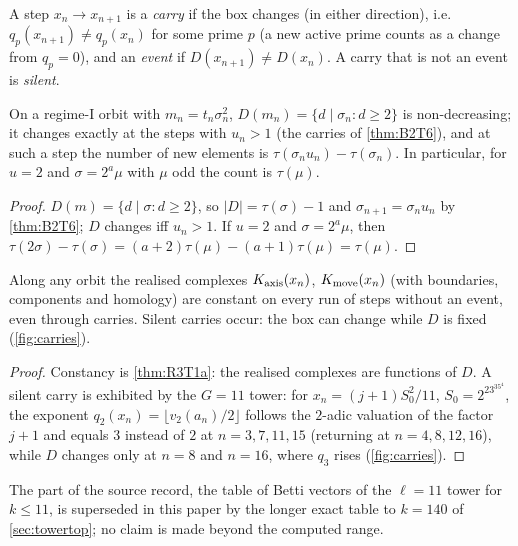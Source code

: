 \begin{definition}\label{def:carry}
A step $x_n\to x_{n+1}$ is a \emph{carry} if the box changes (in either direction), i.e.\ $q_p(x_{n+1})\ne q_p(x_n)$ for some prime $p$ (a new active prime counts as a change from $q_p=0$), and an \emph{event} if $D(x_{n+1})\ne D(x_n)$. A carry that is not an event is \emph{silent}.
\end{definition}
\begin{theorem}\label{thm:B2T8}
On a regime-I orbit with $m_n=t_n\sigma_n^2$, $D(m_n)=\{d\mid\sigma_n:d\ge2\}$ is non-decreasing; it changes exactly at the steps with $u_n>1$ (the carries of \cref{thm:B2T6}), and at such a step the number of new elements is $\tau(\sigma_nu_n)-\tau(\sigma_n)$. In particular, for $u=2$ and $\sigma=2^a\mu$ with $\mu$ odd the count is $\tau(\mu)$.
\end{theorem}
\begin{proof}
$D(m)=\{d\mid\sigma:d\ge2\}$, so $|D|=\tau(\sigma)-1$ and $\sigma_{n+1}=\sigma_nu_n$ by \cref{thm:B2T6}; $D$ changes iff $u_n>1$. If $u=2$ and $\sigma=2^a\mu$, then $\tau(2\sigma)-\tau(\sigma)=(a+2)\tau(\mu)-(a+1)\tau(\mu)=\tau(\mu)$. \qedhere
\end{proof}
\begin{theorem}\label{thm:R3T6}
Along any orbit the realised complexes $K_{\mathrm{axis}}(x_n)$, $K_{\mathrm{move}}(x_n)$ (with boundaries, components and homology) are constant on every run of steps without an event, even through carries. Silent carries occur: the box can change while $D$ is fixed (\cref{fig:carries}).
\end{theorem}
\begin{proof}
Constancy is \cref{thm:R3T1a}: the realised complexes are functions of $D$. A silent carry is exhibited by the $G=11$ tower: for $x_n=(j+1)S_0^2/11$, $S_0=2^23^35^4$, the exponent $q_2(x_n)=\lfloor v_2(a_n)/2\rfloor$ follows the $2$-adic valuation of the factor $j+1$ and equals $3$ instead of $2$ at $n=3,7,11,15$ (returning at $n=4,8,12,16$), while $D$ changes only at $n=8$ and $n=16$, where $q_3$ rises (\cref{fig:carries}). \qedhere
\end{proof}
\begin{remark}
The  part of the source record, the table of Betti vectors of the $\ell=11$ tower for $k\le11$, is superseded in this paper by the longer exact table to $k=140$ of \cref{sec:towertop}; no claim is made beyond the computed range.
\end{remark}
